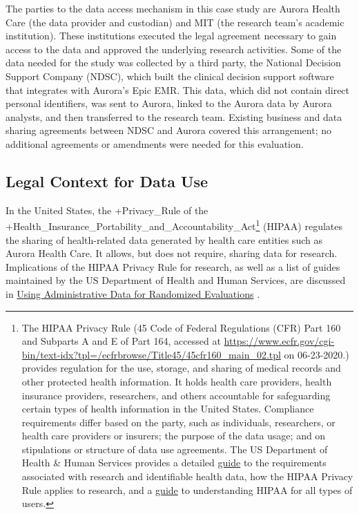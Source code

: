 \documentclass[
]{book}
\begin{document}
The parties to the data access mechanism in this case study are Aurora Health Care (the data provider and custodian) and MIT (the research team's academic institution). These institutions executed the legal agreement necessary to gain access to the data and approved the underlying research activities. Some of the data needed for the study was collected by a third party, the National Decision Support Company (NDSC), which built the clinical decision support software that integrates with Aurora's Epic EMR. This data, which did not contain direct personal identifiers, was sent to Aurora, linked to the Aurora data by Aurora analysts, and then transferred to the research team. Existing business and data sharing agreements between NDSC and Aurora covered this arrangement; no additional agreements or amendments were needed for this evaluation.

\hypertarget{legal-context-for-data-use-4}{%
\subsection{Legal Context for Data Use}\label{legal-context-for-data-use-4}}

In the United States, the +Privacy\_Rule\textbar{} of the +Health\_Insurance\_Portability\_and\_Accountability\_Act\textbar{}\footnote{The HIPAA Privacy Rule (45 Code of Federal Regulations (CFR) Part 160 and Subparts A and E of Part 164, accessed at \url{https://www.ecfr.gov/cgi-bin/text-idx?tpl=/ecfrbrowse/Title45/45cfr160_main_02.tpl} on 06-23-2020.) provides regulation for the use, storage, and sharing of medical records and other protected health information. It holds health care providers, health insurance providers, researchers, and others accountable for safeguarding certain types of health information in the United States. Compliance requirements differ based on the party, such as individuals, researchers, or health care providers or insurers; the purpose of the data usage; and on stipulations or structure of data use agreements. The US Department of Health \& Human Services provides a detailed \href{https://www.hhs.gov/hipaa/for-professionals/special-topics/research/index.html}{guide} \citep[see][]{u.s.departmentofhealthhumanservices2018a} to the requirements associated with research and identifiable health data, how the HIPAA Privacy Rule applies to research, and a \href{https://www.hhs.gov/hipaa/index.html}{guide} \citep[see][]{u.s.departmentofhealthhumanservices} to understanding HIPAA for all types of users.} (HIPAA) regulates the sharing of health-related data generated by health care entities such as Aurora Health Care. It allows, but does not require, sharing data for research. Implications of the HIPAA Privacy Rule for research, as well as a list of guides maintained by the US Department of Health and Human Services, are discussed in \href{https://www.povertyactionlab.org/resource/using-administrative-data-randomized-evaluations}{Using Administrative Data for Randomized Evaluations} \citep{feeney2015}.
\end{document}
